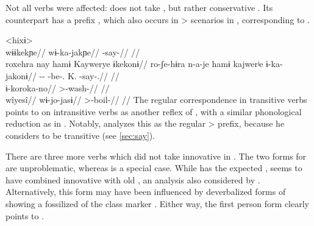 Not all  verbs were affected: \waiwai {}  does not take , but rather conservative  .
Its \hixka counterpart has a prefix  , which also occurs in > scenarios in \hixka {}, corresponding to \waiwai {} .

\pex<hixɨ>
 \waiwai \parencite[][71]{waiwaihawkins1998}\\
\begingl
\glpreamble wɨɨkekɲe//
\gla wɨ-ka-jakɲe//
\glb {}-say-//
\glft {}//
\endgl
{} \hixka \parencite[][124]{hixkaryanaderby1985}\\
\begingl
\glpreamble roxehra nay hamɨ Kaywerye ɨkekonɨ//
\gla ro-ʃe-hɨra n-a-je hamɨ kajwerʲe ɨ-ka-jakonɨ//
\glb {}-- -be-.  K. -say-.//
\glft {}//
\endgl
{} \hixka \parencite[][191]{hixkaryanaderby1985}\\
\begingl
\gla ɨ-koroka-no//
\glb {}>-wash-//
\glft {}//
\endgl
{} \waiwai \parencite[][192]{waiwaihawkins1998}\\
\begingl
\glpreamble wîyesî//
\gla wɨ-jo-jasɨ//
\glb {}>-boil-//
\glft {}//
\endgl
\xe
%
The regular correspondence in transitive verbs points to \hixka {} on intransitive verbs as another reflex of , with a similar phonological reduction as in \ikpeng {}.
Notably, \textcite{hixkaryanaderby1985} analyzes this  as the regular > prefix, because he considers \hixka {}  to be transitive (see \cref{sec:say}).

There are three more verbs which did not take innovative  in \PWai {}.
The two forms for  are unproblematic, whereas  is a special case.
While \hixka has the expected , \waiwai seems to have combined innovative  with  old , an analysis also considered by \textcite[90]{gildea1998}.
Alternatively, this form may have been influenced by deverbalized forms of  showing a fossilized of the  class marker   .
%
%
Either way, the first person form \hixka {} clearly points to \PWai {}.

